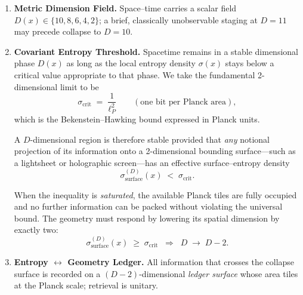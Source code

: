 \documentclass[a4paper, 12pt, oneside]{book}
\numberwithin{equation}{chapter}
\begin{document}
\begin{enumerate}[label=\textbf{P\arabic*}]
  \item \textbf{Metric Dimension Field.}
        Space–time carries a scalar field
        \( D(x) \in \{10,8,6,4,2\} \);
        a brief, classically unobservable staging at \(D=11\) may precede collapse to \(D=10\).

\item \textbf{Covariant Entropy Threshold.}
      Spacetime remains in a stable dimensional phase $D(x)$
      as long as the local entropy density $\sigma(x)$
      stays below a critical value appropriate to that phase.
      We take the fundamental 2-dimensional limit to be
    \begin{equation}
      \sigma_{\text{crit}}
      \;=\;\frac{1}{\ell_P^{2}}
      \qquad
      (\text{one bit per Planck area}),
      \label{eq:sigma_crit_fundamental}
    \end{equation}
          which is the Bekenstein–Hawking bound expressed in Planck units.
    
          A $D$-dimensional region is therefore stable provided that
          \emph{any} notional projection of its information onto a
          2-dimensional bounding surface—such as a lightsheet
          or holographic screen—has an effective surface–entropy density
    \[
      \sigma^{(D)}_{\text{surface}}(x)
      \;<\;
      \sigma_{\text{crit}} .
    \]
    
          When the inequality is \emph{saturated},
          the available Planck tiles are fully occupied
          and no further information can be packed without violating
          the universal bound.
          The geometry must respond by lowering its spatial dimension
          by exactly two:
    \begin{equation}
      \sigma^{(D)}_{\text{surface}}(x)
      \;\ge\;
      \sigma_{\text{crit}}
      \;\;\Longrightarrow\;\;
      D \;\rightarrow\; D-2 .
      \label{eq:collapse_trigger_condition}
    \end{equation}
        
  \item \textbf{Entropy $\leftrightarrow$ Geometry Ledger.}
        All information that crosses the collapse surface is
        recorded on a $(D-2)$-dimensional \emph{ledger surface} whose
        area tiles at the Planck scale; retrieval is unitary.
\end{enumerate}
\end{document}
